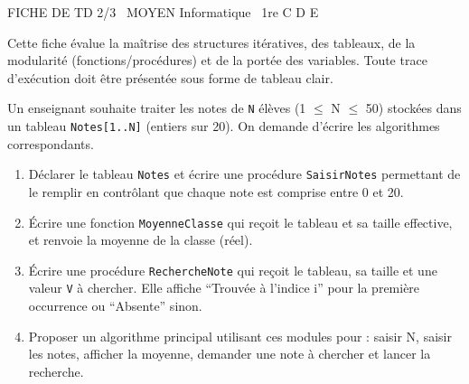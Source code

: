 \documentclass[11pt]{article}
\begin{document}
\begin{tcolorbox}[enhanced,colback=popink,colframe=popink,arc=10pt,boxrule=0pt,left=12pt,right=12pt,top=9pt,bottom=9pt]
{\color{white}\popxbold\small FICHE DE TD 2/3 \textbullet\ MOYEN \hfill Informatique \textbullet\ 1re C D E\par}
\end{tcolorbox}
\vspace{4pt}
\noindent Cette fiche évalue la maîtrise des structures itératives, des tableaux, de la modularité (fonctions/procédures) et de la portée des variables. Toute trace d'exécution doit être présentée sous forme de tableau clair.

\begin{exercice}
Un enseignant souhaite traiter les notes de \texttt{N} élèves (1 $\le$ N $\le$ 50) stockées dans un tableau \texttt{Notes[1..N]} (entiers sur 20). On demande d'écrire les algorithmes correspondants.
\begin{enumerate}
    \item Déclarer le tableau \texttt{Notes} et écrire une procédure \texttt{SaisirNotes} permettant de le remplir en contrôlant que chaque note est comprise entre 0 et 20.
    \item Écrire une fonction \texttt{MoyenneClasse} qui reçoit le tableau et sa taille effective, et renvoie la moyenne de la classe (réel).
    \item Écrire une procédure \texttt{RechercheNote} qui reçoit le tableau, sa taille et une valeur \texttt{V} à chercher. Elle affiche ``Trouvée à l'indice i'' pour la première occurrence ou ``Absente'' sinon.
    \item Proposer un algorithme principal utilisant ces modules pour : saisir N, saisir les notes, afficher la moyenne, demander une note à chercher et lancer la recherche.
\end{enumerate}
\end{exercice}
\end{document}
